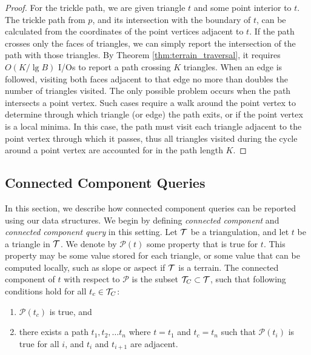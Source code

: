 {\begin{proof}
  For the trickle path, we are given triangle $t$ and some point interior to $t$. 
  The trickle path from $p$, and its intersection with the boundary of $t$, 
  can be calculated from the coordinates of the point vertices adjacent to $t$. 
  If the path crosses only the faces of triangles, we can simply report the 
  intersection of the path with those triangles.
  By Theorem \ref{thm:terrain_traversal}, it 
  requires $O(K/\lg{B})$ I/Os to report a path crossing $K$ triangles. 
  When an edge is followed, visiting both faces adjacent to that edge no more 
  than doubles the number of triangles visited. 
  The only possible problem occurs when the path intersects a point vertex. 
  Such cases require a walk around the point vertex to determine through which 
  triangle 
  (or edge) the path exits, or if the point vertex is a local minima. 
  In this case, the path must visit each triangle adjacent to the point vertex 
  through which it passes, thus all triangles visited during the cycle around a 
  point vertex are accounted for in the path length $K$.
  \end{proof}

  \subsection{Connected Component Queries}\label{sec:con_comp_queries}

  In this section, we describe how connected component queries can be reported 
  using our data structures. 
  We begin by defining \emph{connected component} and \emph{connected
  component query} in this setting.
  Let $\mathcal{T}$ be a triangulation, and let $t$ be a triangle in $\mathcal{T}$. 
  We denote by $\mathcal{P}(t)$ some property that is true for $t$.
  This property may be some value stored for each triangle, or some value that
  can be computed locally, such as slope or aspect if $\mathcal{T}$ is a terrain.
  The connected component of $t$ with respect to $\mathcal{P}$ is the 
  subset ${\mathcal{T}}_C \subset \mathcal{T}$, such that following conditions hold for
  all $t_c \in {\mathcal{T}}_C$:

  \begin{enumerate}
    \item $\mathcal{P}(t_c)$ is true, and
    \item there exists a path $t_1, t_2, \ldots t_n$ where $t = t_1$ and 
    $t_c = t_n$ such that $\mathcal{P}(t_i)$ is true for all $i$, and $t_i$ 
    and $t_{i+1}$ are adjacent.
  \end{enumerate}

}
